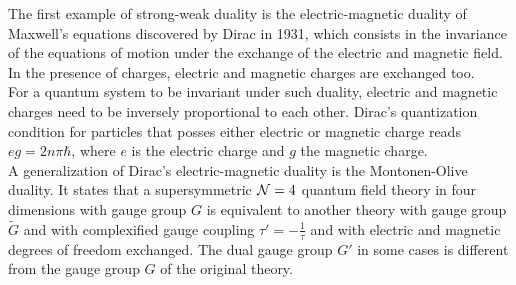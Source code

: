 


The first example of strong-weak duality is the electric-magnetic duality of Maxwell's equations discovered by Dirac in 1931, which consists in the invariance of the equations of motion under the exchange of the electric and magnetic field. 
In the presence of charges, electric and magnetic charges are exchanged too. \\
For a quantum system to be invariant under such duality, electric and magnetic charges need to be inversely proportional to each other. 
Dirac's quantization condition for particles that posses either electric or magnetic charge reads $e g =  2 n \pi \hbar$, where $e$ is the electric charge and $g$ the magnetic charge.
\\

A generalization of Dirac's electric-magnetic duality is the Montonen-Olive duality.
It states that a supersymmetric  $\mathcal{N}=4$ quantum field theory in four dimensions with gauge group $G$ is equivalent to another theory with gauge group $\tilde{G}$ and with complexified gauge coupling $\tau' = - \frac{1}{\tau}$ and with electric and magnetic degrees of freedom exchanged.
The dual gauge group $G'$ in some cases is different from the gauge group $G$ of the original theory.
\\

